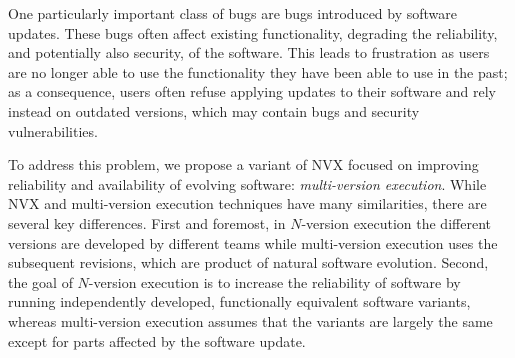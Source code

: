 

One particularly important class of bugs are bugs introduced by software
updates. These bugs often affect existing functionality, degrading the
reliability, and potentially also security, of the software. This leads to
frustration as users are no longer able to use the functionality they have been
able to use in the past; as a consequence, users often refuse applying updates
to their software and rely instead on outdated versions, which may contain bugs
and security vulnerabilities.

To address this problem, we propose a variant of NVX focused on improving
reliability and availability of evolving software: \emph{multi-version
execution}.  While NVX and multi-version execution techniques have many
similarities, there are several key differences.  First and foremost, in
$N$-version execution the different versions are developed by different teams
while multi-version execution uses the subsequent revisions, which are product
of natural software evolution. Second, the goal of $N$-version execution is
to increase the reliability of software by running independently developed,
functionally equivalent software variants, whereas multi-version execution
assumes that the variants are largely the same except for parts affected by the
software update.

